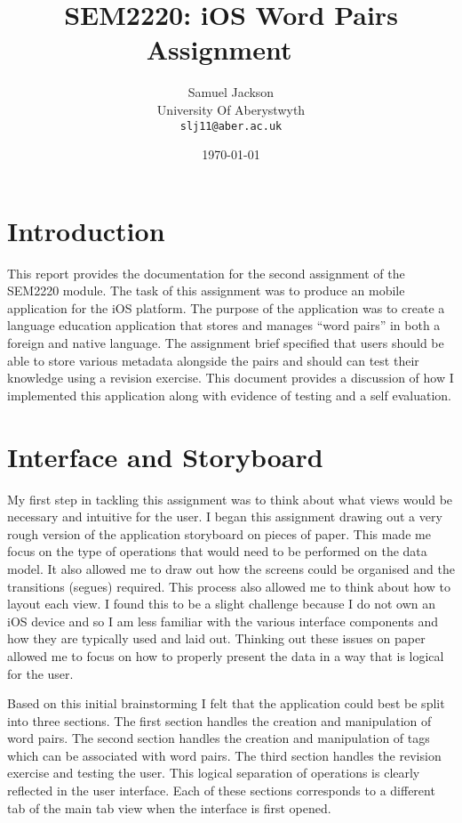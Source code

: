 \documentclass[paper=a4, fontsize=11pt]{scrartcl}	%
\title{
	\vspace{-0.5in} 	\usefont{OT1}{bch}{b}{n}
        SEM2220: iOS Word Pairs Assignment \
}
\author{
	\usefont{OT1}{bch}{m}{n} Samuel Jackson
	\\ \usefont{OT1}{bch}{m}{n} University Of Aberystwyth
	\\   \texttt{slj11@aber.ac.uk}
}
\date{\today}
\numberwithin{equation}{section}															%
\numberwithin{figure}{section}																%
\numberwithin{table}{section}
\begin{document}
\maketitle

\clearpage

\section{Introduction}
This report provides the documentation for the second assignment of the SEM2220 module. The task of this assignment was to produce an mobile application for the iOS platform. The purpose of the application was to create a language education application that stores and manages ``word pairs'' in both a foreign and native language. The assignment brief specified that users should be able to store various metadata alongside the pairs and should can test their knowledge using a revision exercise. This document provides a discussion of how I implemented this application along with evidence of testing and a self evaluation. 

\section{Interface and Storyboard}
My first step in tackling this assignment was to think about what views would be necessary and intuitive for the user. I began this assignment drawing out a very rough version of the application storyboard on pieces of paper. This made me focus on the type of operations that would need to be performed on the data model. It also allowed me to draw out how the screens could be organised and the transitions (segues) required. This process also allowed me to think about how to layout each view. I found this to be a slight challenge because I do not own an iOS device and so I am less familiar with the various interface components and how they are typically used and laid out. Thinking out these issues on paper allowed me to focus on how to properly present the data in a way that is logical for the user.

Based on this initial brainstorming I felt that the application could best be split into three sections. The first section handles the creation and manipulation of word pairs. The second section handles the creation and manipulation of tags which can be associated with word pairs. The third section handles the revision exercise and testing the user. This logical separation of operations is clearly reflected in the user interface. Each of these sections corresponds to a different tab of the main tab view when the interface is first opened.
\end{document}
